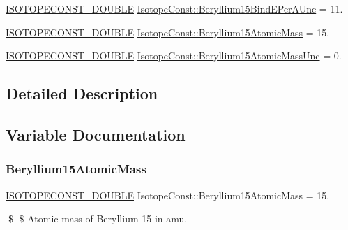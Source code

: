 \begin{DoxyCompactItemize}
\mbox{\hyperlink{group___isotope_const-_macros_ga8f45a7272ce02c0b4c65c44636ed719a}{I\+S\+O\+T\+O\+P\+E\+C\+O\+N\+S\+T\+\_\+\+D\+O\+U\+B\+LE}} \mbox{\hyperlink{group___isotope_const-_beryllium-_be15_ga3cb5714538722fc3df7e7317bcfa5f3d}{Isotope\+Const\+::\+Beryllium15\+Bind\+E\+Per\+A\+Unc}} = 11.
\item 
\mbox{\hyperlink{group___isotope_const-_macros_ga8f45a7272ce02c0b4c65c44636ed719a}{I\+S\+O\+T\+O\+P\+E\+C\+O\+N\+S\+T\+\_\+\+D\+O\+U\+B\+LE}} \mbox{\hyperlink{group___isotope_const-_beryllium-_be15_gad07283ee695a3848ef5786277f52bd93}{Isotope\+Const\+::\+Beryllium15\+Atomic\+Mass}} = 15.
\item 
\mbox{\hyperlink{group___isotope_const-_macros_ga8f45a7272ce02c0b4c65c44636ed719a}{I\+S\+O\+T\+O\+P\+E\+C\+O\+N\+S\+T\+\_\+\+D\+O\+U\+B\+LE}} \mbox{\hyperlink{group___isotope_const-_beryllium-_be15_gaf25225a16085e4375ff7fa17f91c8535}{Isotope\+Const\+::\+Beryllium15\+Atomic\+Mass\+Unc}} = 0.
\end{DoxyCompactItemize}


\subsection{Detailed Description}


\subsection{Variable Documentation}
\mbox{\label{group___isotope_const-_beryllium-_be15_gad07283ee695a3848ef5786277f52bd93}} 
\subsubsection{\texorpdfstring{Beryllium15\+Atomic\+Mass}{Beryllium15AtomicMass}}
{\footnotesize\ttfamily \mbox{\hyperlink{group___isotope_const-_macros_ga8f45a7272ce02c0b4c65c44636ed719a}{I\+S\+O\+T\+O\+P\+E\+C\+O\+N\+S\+T\+\_\+\+D\+O\+U\+B\+LE}} Isotope\+Const\+::\+Beryllium15\+Atomic\+Mass = 15.}

\$ \$ Atomic mass of Beryllium-\/15 in amu. \mbox{\label{group___isotope_const-_beryllium-_be15_gaf25225a16085e4375ff7fa17f91c8535}} 
